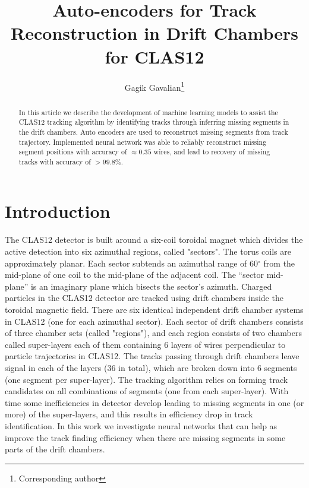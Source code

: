\documentclass[12pt]{article}
\title{Auto-encoders for Track Reconstruction in Drift Chambers for CLAS12}
\author[1]{Gagik Gavalian\thanks{Corresponding author}}
\affil[1]{Thomas Jefferson National Accelerator Facility, Newport News, VA 23606}
\date{}
\begin{document}
\begin{titlepage}
\maketitle
\begin{abstract}
In this article we describe the development of machine learning models to assist the CLAS12 tracking algorithm
by identifying tracks through inferring missing segments in the drift chambers.  Auto encoders are used to reconstruct 
missing segments from track trajectory. Implemented neural network was able to reliably reconstruct missing segment positions with accuracy of $\approx 0.35$ wires, and lead to recovery of missing tracks with accuracy of $>99.8\%$. 
\end{abstract}
\end{titlepage}

\section{Introduction}

\indent

The CLAS12\cite{Burkert:2020akg} detector is built around a six-coil toroidal magnet which divides the active detection into six azimuthal regions, called "sectors". The torus coils are approximately planar. Each sector subtends an azimuthal range of 60$^\circ$ from the mid-plane of one coil to the mid-plane of the adjacent coil. The “sector mid-plane” is an imaginary plane which bisects the sector’s azimuth. 
Charged particles in the CLAS12 detector are tracked using drift chambers\cite{Mestayer:2020saf} inside the toroidal magnetic field. There are six identical independent drift chamber systems in CLAS12 (one for each azimuthal sector). Each sector of drift chambers consists of three chamber sets (called "regions"), and each region consists of two chambers called super-layers each of them containing 6 layers of wires perpendicular to particle trajectories in CLAS12. The tracks passing through drift chambers leave signal in each of the layers (36 in total), which are broken down into 6 segments (one segment per super-layer). The tracking algorithm relies on forming track candidates on all combinations of segments (one from each super-layer).
With time some inefficiencies in detector develop leading to missing segments in one (or more) of the super-layers, and this results in efficiency drop in track identification. In this work we investigate neural networks that can help as improve the track finding efficiency when there are missing segments in some parts of the drift chambers.
\end{document}
